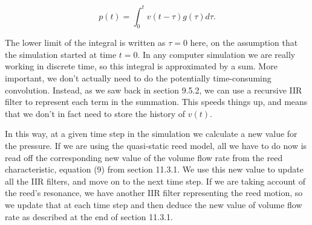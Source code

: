   $$p(t) = \int_0^t{v(t-\tau) g(\tau) d \tau} . \tag{3}$$ 

  The lower limit of the integral is written as $\tau=0$ here, on the 
  assumption that the simulation started at time $t=0$. In any computer 
  simulation we are really working in discrete time, so this integral is 
  approximated by a sum. More important, we don’t actually need to do the 
  potentially time-consuming convolution. Instead, as we saw back in section 
  9.5.2, we can use a recursive IIR filter to represent each term in the 
  summation. This speeds things up, and means that we don’t in fact need to 
  store the history of $v(t)$. 

  In this way, at a given time step in the simulation we calculate a new value 
  for the pressure. If we are using the quasi-static reed model, all we have to 
  do now is read off the corresponding new value of the volume flow rate from 
  the reed characteristic, equation (9) from section 11.3.1. We use this new 
  value to update all the IIR filters, and move on to the next time step. If we 
  are taking account of the reed’s resonance, we have another IIR filter 
  representing the reed motion, so we update that at each time step and then 
  deduce the new value of volume flow rate as described at the end of section 
  11.3.1. 